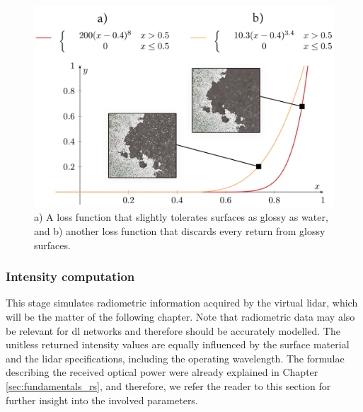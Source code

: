 \begin{figure}
	\centering
	\includegraphics[width=.75\linewidth]{figs/lidar_simulation/glossy_loss.png}
	\caption{a) A loss function that slightly tolerates surfaces as glossy as water, and b) another loss function that discards every return from glossy surfaces. }
	\label{fig:glossy_loss}
\end{figure}

\subsubsection{Intensity computation}

This stage simulates radiometric information acquired by the virtual \acrshort{lidar}, which will be the matter of the following chapter. Note that radiometric data may also be relevant for \acrshort{dl} networks and therefore should be accurately modelled. The unitless returned intensity values are equally influenced by the surface material and the \acrshort{lidar} specifications, including the operating wavelength. The formulae describing the received optical power were already explained in Chapter \ref{sec:fundamentals_rs}, and therefore, we refer the reader to this section for further insight into the involved parameters. 

